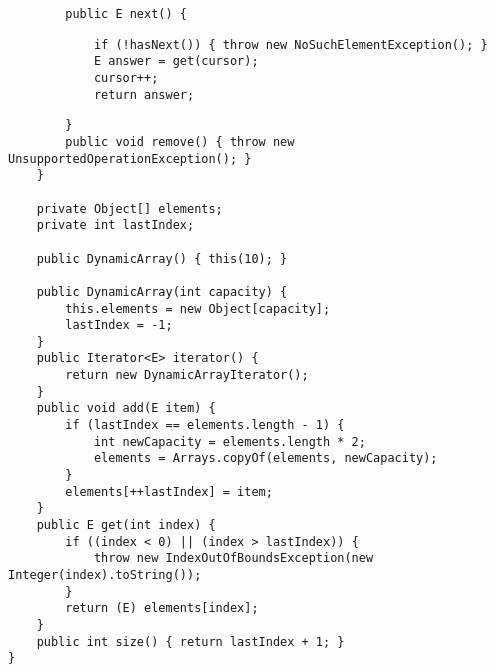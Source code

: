 \documentclass[addpoints,9pt]{exam}
\begin{document}
\begin{questions}
\begin{verbatim}
        public E next() {
\end{verbatim}
\ifprintanswers
\begin{lstlisting}
            if (!hasNext()) { throw new NoSuchElementException(); }
            E answer = get(cursor);
            cursor++;
            return answer;
\end{lstlisting}
\else
\vspace{.4in}
\fi
\begin{verbatim}
        }
        public void remove() { throw new UnsupportedOperationException(); }
    }

    private Object[] elements;
    private int lastIndex;

    public DynamicArray() { this(10); }

    public DynamicArray(int capacity) {
        this.elements = new Object[capacity];
        lastIndex = -1;
    }
    public Iterator<E> iterator() {
        return new DynamicArrayIterator();
    }
    public void add(E item) {
        if (lastIndex == elements.length - 1) {
            int newCapacity = elements.length * 2;
            elements = Arrays.copyOf(elements, newCapacity);
        }
        elements[++lastIndex] = item;
    }
    public E get(int index) {
        if ((index < 0) || (index > lastIndex)) {
            throw new IndexOutOfBoundsException(new Integer(index).toString());
        }
        return (E) elements[index];
    }
    public int size() { return lastIndex + 1; }
}
\end{verbatim}



\end{questions}
\end{document}
